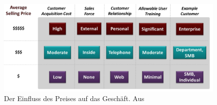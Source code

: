 \begin{figure}[ht]
\begin{center}
\includegraphics[width=\textwidth]{images/einfluss_des_preises_auf_business.png}
\caption{Der Einfluss des Preises auf das Geschäft. Aus
\protect{} }
\label{fig:einfluss_des_preises_auf_business}
\end{center}
\end{figure}

